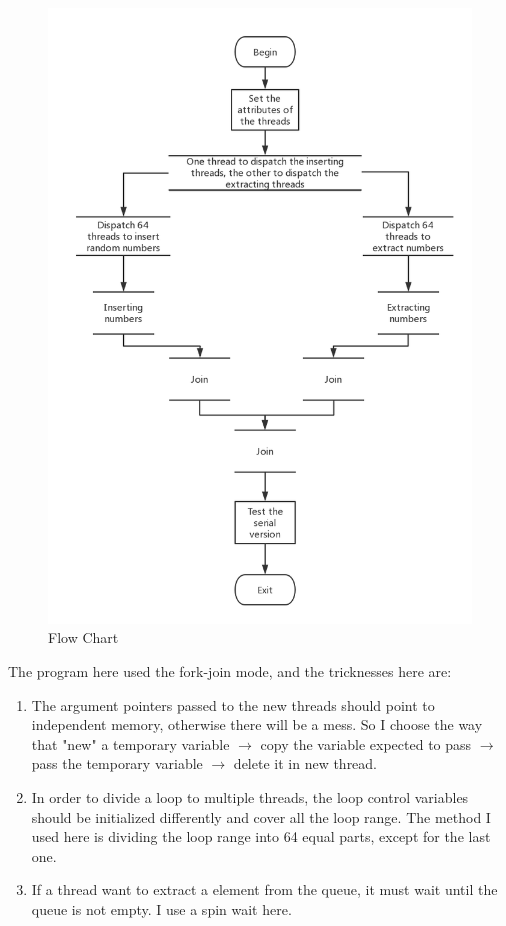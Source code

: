 \documentclass{article}
\begin{document}
	\begin{figure}[H]
		\centering
		\includegraphics[scale=0.4]{imgs/Multiqueue.png}
		\caption{Flow Chart}
		\label{fig:Multiqueue}
	\end{figure}
	The program here used the fork-join mode, and the tricknesses here are:
	\begin{enumerate}[1.]
		\item The argument pointers passed to the new threads should point to independent memory, otherwise there will be a mess. So I choose the way that "new" a temporary variable $\to$ copy the variable expected to pass $\to$ pass the temporary variable $\to$ delete it in new thread. 
		\item In order to divide a loop to multiple threads, the loop control variables should be initialized differently and cover all the loop range. The method I used here is dividing the loop range into 64 equal parts, except for the last one.
		\item If a thread want to extract a element from the queue, it must wait until the queue is not empty. I use a spin wait here.
	\end{enumerate}
\end{document}
